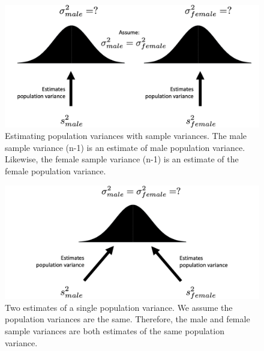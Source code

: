 \documentclass[
]{krantz}
\begin{document}
\newpage

\begin{figure}
\includegraphics[width=0.8\linewidth]{ch_samples/images/pool1} \caption[Estimating population variances with sample variances]{Estimating population variances with sample variances. The male sample variance (n-1) is an estimate of male population variance. Likewise, the female sample variance (n-1) is an estimate of the female population variance. }\label{fig:pool1}
\end{figure}

\vspace{25mm}

\begin{figure}
\includegraphics[width=0.8\linewidth]{ch_samples/images/pool2} \caption[Two estimates of a single population variance]{Two estimates of a single population variance. We assume the population variances are the same. Therefore, the male and female sample variances are both estimates of the same population variance.}\label{fig:pool2}
\end{figure}

\newpage
\end{document}
